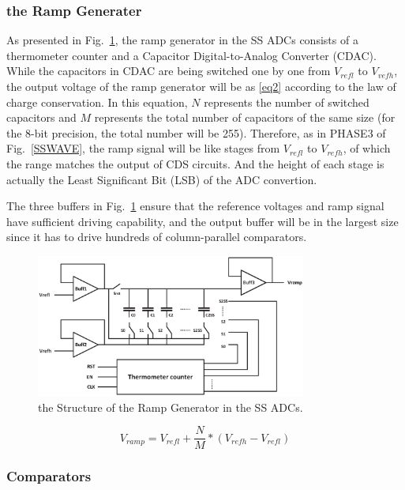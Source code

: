 \subsubsection{the Ramp Generater}

As presented in Fig.~\ref{RAMP}, the ramp generator in the SS ADCs consists of a thermometer counter and a Capacitor Digital-to-Analog Converter (CDAC). 
While the capacitors in CDAC are being switched one by one from $V_{refl}$ to $V_{vefh}$, the output voltage of the ramp generator will be as \eqref{eq2} according to the law of charge conservation. 
In this equation, $N$ represents the number of switched capacitors and $M$ represents the total number of capacitors of the same size (for the 8-bit precision, the total number will be 255). 
Therefore, as in PHASE3 of Fig.~\ref{SSWAVE}, the ramp signal will be like stages from $V_{refl}$ to $V_{refh}$, of which the range matches the output of CDS circuits. 
And the height of each stage is actually the Least Significant Bit (LSB) of the ADC convertion.

The three buffers in Fig.~\ref{RAMP} ensure that the reference voltages and ramp signal have sufficient driving capability, 
and the output buffer will be in the largest size since it has to drive hundreds of column-parallel comparators.

\begin{figure}[htbp]
	\centerline{\includegraphics[width=3.5in]{./Figures/RAMP.eps}}
	\caption{the Structure of the Ramp Generator in the SS ADCs.}
	\label{RAMP}
\end{figure} 

\begin{equation}
	V_{ramp}=V_{refl}+\frac{N}{M}\ast\left(V_{refh}-V_{refl}\right)
	\label{eq2}
\end{equation}

\subsubsection{Comparators}

